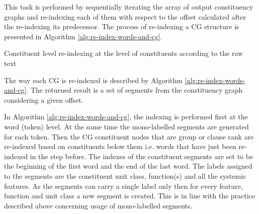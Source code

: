     This task is performed by sequentially iterating the array of output constituency graphs and re-indexing each of them with respect to the offset calculated after the re-indexing its predecessor. The process of re-indexing a CG structure is presented in Algorithm \ref{alg:re-index-words-and-cg}.

    \begin{algorithm}[!ht]
        \caption{Constituent level re-indexing at the level of constituents according to the raw text}
        \label{alg:re-index-words-and-cg}
    \end{algorithm}

    The way each CG is re-indexed is described by Algorithm \ref{alg:re-index-words-and-cg}. The returned result is a set of segments from the constituency graph considering a given offset. 
    
    In Algorithm \ref{alg:re-index-words-and-cg}, the indexing is performed first at the word (token) level. At the same time the mono-labelled segments are generated for each token. Then the CG constituent nodes that are group or clause rank are re-indexed based on constituents below them i.e. words that have just been re-indexed in the step before. The indexes of the constituent segments are set to be the beginning of the first word and the end of the last word. The labels assigned to the segments are the constituent unit class, function(s) and all the systemic features. As the segments can carry a single label only then for every feature, function and unit class a new segment is created. This is in line with the practice described above concerning usage of mono-labelled segments.

